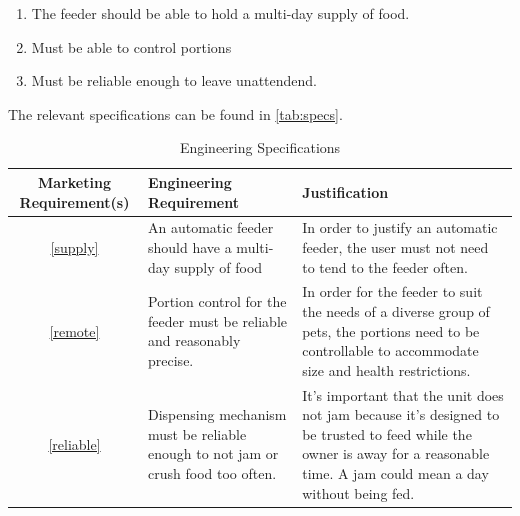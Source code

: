 \documentclass[12pt]{article}
\newcounter{engineering}
\begin{document}
\begin{enumerate}
    \item\label{supply} The feeder should be able to hold a multi-day supply of food.
    \item\label{remote} Must be able to control portions
    \item\label{reliable} Must be reliable enough to leave unattendend.
\end{enumerate}
The relevant specifications can be found in \autoref{tab:specs}.

\begin{table}[H]
    \centering
    \caption{Engineering Specifications}
    \label{tab:specs}
    \begin{tabularx}{\linewidth}{cXX} \toprule
        Marketing Requirement(s) & Engineering Requirement & Justification \\ \midrule
        \ref{supply}             &  An automatic feeder should have a multi-day supply of food & In order to justify an automatic feeder, the user must not need to tend to the feeder often.\\
        \ref{remote}              & Portion control for the feeder must be reliable and reasonably precise. & In order for the feeder to suit the needs of a diverse group of pets, the portions need to be controllable to accommodate size and health restrictions. \\
        \ref{reliable}            & Dispensing mechanism must be reliable enough to not jam or crush food too often.& It’s important that the unit does not jam because it’s designed to be trusted to feed while the owner is away for a reasonable time. A jam could mean a day without being fed.\\
    \end{tabularx}
\end{table}

\end{document}
